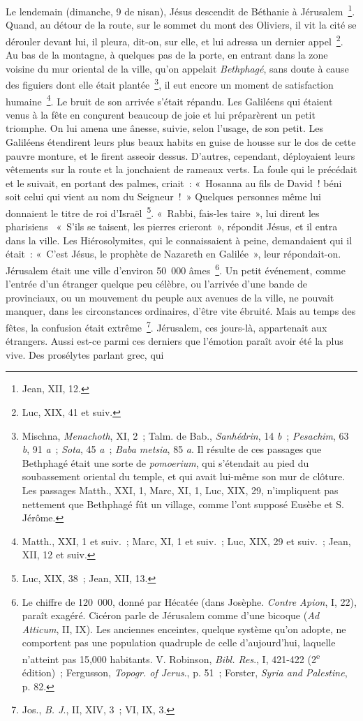 \documentclass[french,twoside]{book} %
\begin{document}
Le lendemain (dimanche, 9 de nisan), Jésus descendit de Béthanie à Jérusalem \footnote{Jean, XII, 12.}. Quand, au détour de la route, sur le sommet du mont des Oliviers, il vit la cité se dérouler devant lui, il pleura, dit-on, sur elle, et lui adressa un dernier appel \footnote{Luc, XIX, 41 et suiv.}. Au bas de la montagne, à quelques pas de la porte, en entrant dans la zone voisine du mur oriental de la ville, qu’on appelait {\itshape Bethphagé}, sans doute à cause des figuiers dont elle était plantée \footnote{ Mischna, {\itshape Menachoth}, XI, 2 ; Talm. de Bab., {\itshape Sanhédrin}, 14 {\itshape b} ; {\itshape Pesachim}, 63 {\itshape b}, 91 {\itshape a} ; {\itshape Sota}, 45 {\itshape a} ; {\itshape Baba metsia}, 85 {\itshape a}. Il résulte de ces passages que Bethphagé était une sorte de {\itshape pomoerium}, qui s’étendait au pied du soubassement oriental du temple, et qui avait lui-même son mur de clôture. Les passages Matth., XXI, 1, Marc, XI, 1, Luc, XIX, 29, n’impliquent pas nettement que Bethphagé fût un village, comme l’ont supposé Eusèbe et S. Jérôme.}, il eut encore un moment de satisfaction humaine \footnote{Matth., XXI, 1 et suiv. ; Marc, XI, 1 et suiv. ; Luc, XIX, 29 et suiv. ; Jean, XII, 12 et suiv.}. Le bruit de son arrivée s’était répandu. Les Galiléens qui étaient venus à la fête en conçurent beaucoup de joie et lui préparèrent un petit triomphe. On lui amena une ânesse, suivie, selon l’usage, de son petit. Les Galiléens étendirent leurs plus beaux habits en guise de housse sur le dos de cette pauvre monture, et le firent asseoir dessus. D’autres, cependant, déployaient leurs vêtements sur la route et la jonchaient de rameaux verts. La foule qui le précédait et le suivait, en portant des palmes, criait : « Hosanna au fils de David ! béni soit celui qui vient au nom du Seigneur ! » Quelques personnes même lui donnaient le titre de roi d’Israël \footnote{Luc, XIX, 38 ; Jean, XII, 13.}. « Rabbi, fais-les taire », lui dirent les pharisiens  « S’ils se taisent, les pierres crieront », répondit Jésus, et il entra dans la ville. Les Hiérosolymites, qui le connaissaient à peine, demandaient qui il était : « C’est Jésus, le prophète de Nazareth en Galilée », leur répondait-on. Jérusalem était une ville d’environ 50 000 âmes \footnote{ Le chiffre de 120 000, donné par Hécatée (dans Josèphe. {\itshape Contre Apion}, I, 22), paraît exagéré. Cicéron parle de Jérusalem comme d’une bicoque ({\itshape Ad Atticum}, II, IX). Les anciennes enceintes, quelque système qu’on adopte, ne comportent pas une population quadruple de celle d’aujourd’hui, laquelle n’atteint pas 15,000 habitants. V. Robinson, {\itshape Bibl. Res}., I, 421-422 (2\textsuperscript{e} édition) ; Fergusson, {\itshape Topogr. of Jerus}., p. 51 ; Forster, {\itshape Syria and Palestine}, p. 82.}. Un petit événement, comme l’entrée d’un étranger quelque peu célèbre, ou l’arrivée d’une bande de provinciaux, ou un mouvement du peuple aux avenues de la ville, ne pouvait manquer, dans les circonstances ordinaires, d’être vite ébruité. Mais au temps des fêtes, la confusion était extrême \footnote{ Jos., {\itshape B. J}., II, XIV, 3 ; VI, IX, 3.}. Jérusalem, ces jours-là, appartenait aux étrangers. Aussi est-ce parmi ces derniers que l’émotion paraît avoir été la plus vive. Des prosélytes parlant grec, qui 
\end{document}
